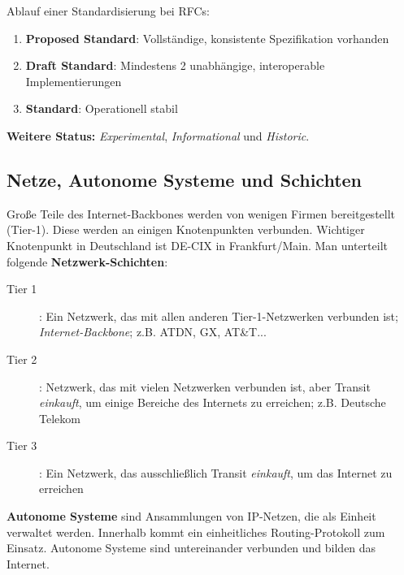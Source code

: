 \documentclass{article} %
\begin{document}
Ablauf einer Standardisierung bei RFCs:
\begin{enumerate}
	\item \textbf{Proposed Standard}: Vollständige, konsistente Spezifikation vorhanden
	\item \textbf{Draft Standard}: Mindestens 2 unabhängige, interoperable Implementierungen
	\item \textbf{Standard}: Operationell stabil
\end{enumerate}
\textbf{Weitere Status:} \emph{Experimental}, \emph{Informational} und \emph{Historic}.
\subsection{Netze, Autonome Systeme und Schichten}
Große Teile des Internet-Backbones werden von wenigen Firmen bereitgestellt (Tier-1).
Diese werden an einigen Knotenpunkten verbunden.
Wichtiger Knotenpunkt in Deutschland ist DE-CIX in Frankfurt/Main.
Man unterteilt folgende \textbf{Netzwerk-Schichten}:
\begin{description}
	\item[Tier 1]: Ein Netzwerk, das mit allen anderen Tier-1-Netzwerken verbunden ist; \emph{Internet-Backbone}; z.B. ATDN, GX, AT\&T...
	\item[Tier 2]: Netzwerk, das mit vielen Netzwerken verbunden ist, aber Transit \emph{einkauft}, um einige Bereiche des Internets zu erreichen; z.B. Deutsche Telekom
	\item[Tier 3]: Ein Netzwerk, das ausschließlich Transit \emph{einkauft}, um das
	Internet zu erreichen
\end{description}
\textbf{Autonome Systeme} sind Ansammlungen von IP-Netzen, die als Einheit verwaltet werden.
Innerhalb kommt ein einheitliches Routing-Protokoll zum Einsatz.
Autonome Systeme sind untereinander verbunden und
bilden das Internet.
\end{document}
